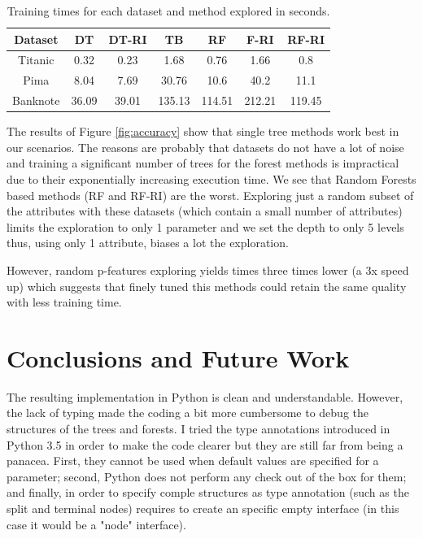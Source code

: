 \documentclass[a4paper,10pt]{article}
\begin{document}
\begin{table}[H]
    \centering
    \begin{tabular}{|c|c|c|c|c|c|c|}
        \hline
	  Dataset & DT & DT-RI & TB & RF & F-RI & RF-RI \\ \hline
	  Titanic & 0.32 & 0.23 & 1.68 & 0.76 & 1.66 & 0.8 \\ \hline
	  Pima & 8.04 & 7.69 & 30.76 & 10.6 & 40.2 & 11.1 \\ \hline
	  Banknote & 36.09 & 39.01 & 135.13 & 114.51 & 212.21 & 119.45 \\ \hline
    \end{tabular}	
    \caption{Training times for each dataset and method explored in seconds.
    \label{tab:times}
}
\end{table}


The results of Figure \ref{fig:accuracy} show that single tree methods work best in our scenarios. The reasons are probably that datasets do not have a lot of noise and training a significant number of trees for the forest methods is impractical due to their exponentially increasing execution time. We see that Random Forests based methods (RF and RF-RI) are the worst. Exploring just a random subset of the attributes with these datasets (which contain a small number of attributes) limits the exploration to only 1 parameter and we set the depth to only 5 levels thus, using only 1 attribute, biases a lot the exploration. 

However, random p-features exploring yields times three times lower (a 3x speed up) which suggests that finely tuned this methods could retain the same quality with less training time.


\section{Conclusions and Future Work}

The resulting implementation in Python is clean and understandable. However, the lack of typing made the coding a bit more cumbersome to debug the structures of the trees and forests. I tried the type annotations introduced in Python 3.5 in order to make the code clearer but they are still far from being a panacea. First, they cannot be used when default values are specified for a parameter; second, Python does not perform any check out of the box for them; and finally, in order to specify comple structures as type annotation (such as the split and terminal nodes) requires to create an specific empty interface (in this case it would be a "node" interface).
\end{document}
